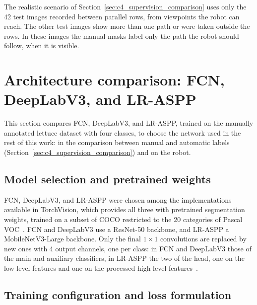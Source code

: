 The realistic scenario of Section~\ref{sec:c4_supervision_comparison} uses only the 42 test images recorded between parallel rows, from viewpoints the robot can reach. The other test images show more than one path or were taken outside the rows. In these images the manual masks label only the path the robot should follow, when it is visible.

\section{Architecture comparison: FCN, DeepLabV3, and LR-ASPP}
\label{sec:c4_architecture_comparison}

This section compares FCN, DeepLabV3, and LR-ASPP, trained on the manually annotated lettuce dataset with four classes, to choose the network used in the rest of this work: in the comparison between manual and automatic labels (Section~\ref{sec:c4_supervision_comparison}) and on the robot.

\subsection{Model selection and pretrained weights}
\label{subsec:c4_model_selection}

FCN, DeepLabV3, and LR-ASPP were chosen among the implementations available in TorchVision, which provides all three with pretrained segmentation weights, trained on a subset of COCO restricted to the 20 categories of Pascal VOC~\cite{torchvision_fcn,torchvision_deeplabv3,torchvision_lraspp}. FCN and DeepLabV3 use a ResNet-50 backbone, and LR-ASPP a MobileNetV3-Large backbone. Only the final $1\times1$ convolutions are replaced by new ones with 4 output channels, one per class: in FCN and DeepLabV3 those of the main and auxiliary classifiers, in LR-ASPP the two of the head, one on the low-level features and one on the processed high-level features~\cite{torchvision_lraspp}.

\subsection{Training configuration and loss formulation}
\label{subsec:c4_training_config}

